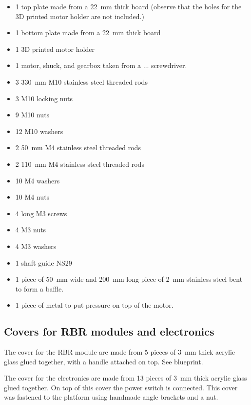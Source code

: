 \begin{itemize}
  \item 1 top plate made from a 22~mm thick board (observe that the holes for
    the 3D printed motor holder are not included.)
  \item 1 bottom plate made from a 22~mm thick board
  \item 1 3D printed motor holder
  \item 1 motor, shuck, and gearbox taken from a $\dots$
    screwdriver.
  \item 3 330~mm M10 stainless steel threaded rods
  \item 3 M10 locking nuts
  \item 9 M10 nuts
  \item 12 M10 washers
  \item 2 50~mm M4 stainless steel threaded rods
  \item 2 110~mm M4 stainless steel threaded rods
  \item 10 M4 washers
  \item 10 M4 nuts
  \item 4 long M3 screws
  \item 4 M3 nuts
  \item 4 M3 washers
  \item 1 shaft guide NS29
  \item 1 piece of 50~mm wide and 200~mm long piece of 2~mm stainless steel
    bent to form a baffle.
  \item 1 piece of metal to put pressure on top of the motor.
\end{itemize}


\subsection{Covers for RBR modules and electronics}

The cover for the RBR module are made from 5 pieces of 3~mm thick acrylic glass
glued together, with a handle attached on top. See blueprint.

The cover for the electronics are made from 13 pieces of 3~mm thick acrylic glass
glued together. On top of this cover the power switch is connected. This cover
was fastened to the platform using handmade angle brackets and a nut.

